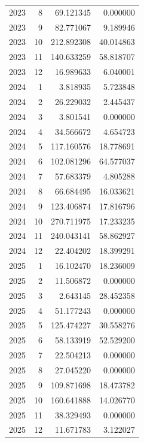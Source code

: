 \begin{tabular}{rrrr}
2023 & 8 & 69.121345 & 0.000000 \\
2023 & 9 & 82.771067 & 9.189946 \\
2023 & 10 & 212.892308 & 40.014863 \\
2023 & 11 & 140.633259 & 58.818707 \\
2023 & 12 & 16.989633 & 6.040001 \\
2024 & 1 & 3.818935 & 5.723848 \\
2024 & 2 & 26.229032 & 2.445437 \\
2024 & 3 & 3.801541 & 0.000000 \\
2024 & 4 & 34.566672 & 4.654723 \\
2024 & 5 & 117.160576 & 18.778691 \\
2024 & 6 & 102.081296 & 64.577037 \\
2024 & 7 & 57.683379 & 4.805288 \\
2024 & 8 & 66.684495 & 16.033621 \\
2024 & 9 & 123.406874 & 17.816796 \\
2024 & 10 & 270.711975 & 17.233235 \\
2024 & 11 & 240.043141 & 58.862927 \\
2024 & 12 & 22.404202 & 18.399291 \\
2025 & 1 & 16.102470 & 18.236009 \\
2025 & 2 & 11.506872 & 0.000000 \\
2025 & 3 & 2.643145 & 28.452358 \\
2025 & 4 & 51.177243 & 0.000000 \\
2025 & 5 & 125.474227 & 30.558276 \\
2025 & 6 & 58.133919 & 52.529200 \\
2025 & 7 & 22.504213 & 0.000000 \\
2025 & 8 & 27.045220 & 0.000000 \\
2025 & 9 & 109.871698 & 18.473782 \\
2025 & 10 & 160.641888 & 14.026770 \\
2025 & 11 & 38.329493 & 0.000000 \\
2025 & 12 & 11.671783 & 3.122027 \\
\bottomrule
\end{tabular}
